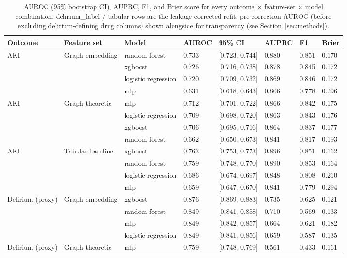 \begin{table}[t]
\centering
\caption{AUROC (95\% bootstrap CI), AUPRC, F1, and Brier score for every outcome $\times$ feature-set $\times$ model combination. delirium\_label / tabular rows are the leakage-corrected refit; pre-correction AUROC (before excluding delirium-defining drug columns) shown alongside for transparency (see Section~\ref{sec:methods}).}
\label{tab:model_results}
\begin{tabular}{llllllll}
\toprule
Outcome & Feature set & Model & AUROC & 95\% CI & AUPRC & F1 & Brier \\
\midrule
AKI & Graph embedding & random forest & 0.733 & [0.723, 0.744] & 0.880 & 0.851 & 0.170 \\
 &  & xgboost & 0.726 & [0.716, 0.738] & 0.878 & 0.845 & 0.172 \\
 &  & logistic regression & 0.720 & [0.709, 0.732] & 0.869 & 0.846 & 0.172 \\
 &  & mlp & 0.631 & [0.618, 0.643] & 0.806 & 0.778 & 0.296 \\
AKI & Graph-theoretic & mlp & 0.712 & [0.701, 0.722] & 0.866 & 0.842 & 0.175 \\
 &  & logistic regression & 0.709 & [0.698, 0.720] & 0.863 & 0.843 & 0.176 \\
 &  & xgboost & 0.706 & [0.695, 0.716] & 0.864 & 0.837 & 0.177 \\
 &  & random forest & 0.662 & [0.650, 0.673] & 0.841 & 0.817 & 0.193 \\
AKI & Tabular baseline & xgboost & 0.763 & [0.753, 0.773] & 0.896 & 0.851 & 0.162 \\
 &  & random forest & 0.759 & [0.748, 0.770] & 0.890 & 0.853 & 0.164 \\
 &  & logistic regression & 0.686 & [0.674, 0.697] & 0.848 & 0.808 & 0.210 \\
 &  & mlp & 0.659 & [0.647, 0.670] & 0.841 & 0.779 & 0.294 \\
\addlinespace
Delirium (proxy) & Graph embedding & xgboost & 0.876 & [0.869, 0.883] & 0.735 & 0.625 & 0.121 \\
 &  & random forest & 0.849 & [0.841, 0.858] & 0.710 & 0.569 & 0.133 \\
 &  & mlp & 0.849 & [0.842, 0.857] & 0.664 & 0.621 & 0.182 \\
 &  & logistic regression & 0.849 & [0.841, 0.856] & 0.659 & 0.587 & 0.135 \\
Delirium (proxy) & Graph-theoretic & mlp & 0.759 & [0.748, 0.769] & 0.561 & 0.433 & 0.161 \\

\end{tabular}
\end{table}
